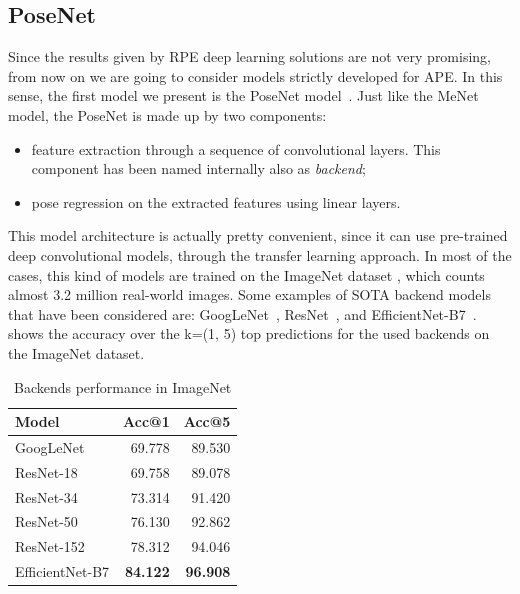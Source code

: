 \subsection{PoseNet}
Since the results given by RPE deep learning solutions are not very promising, from now on we are going to consider models strictly developed for APE.
In this sense, the first model we present is the PoseNet model~\cite{9348762}.
Just like the MeNet model, the PoseNet is made up by two components:
\begin{itemize}
    \item feature extraction through a sequence of convolutional layers. This component has been named internally also as \emph{backend};
    \item pose regression on the extracted features using linear layers.
\end{itemize}
This model architecture is actually pretty convenient, since it can use pre-trained deep convolutional models, through the transfer learning approach. In most of the cases, this kind of models are trained on the ImageNet dataset \cite{imagenet}, which counts almost 3.2 million real-world images. Some examples of SOTA backend models that have been considered are: GoogLeNet~\cite{googlenet}, ResNet~\cite{resnet}, and EfficientNet-B7~\cite{efficientnet}.  shows the accuracy over the k=(1, 5) top predictions for the used backends on the ImageNet dataset.

\begin{table}[htbp]
    \caption{Backends performance in ImageNet}
    \begin{center}
        \begin{tabular}{lrr}
            \toprule
            Model           & Acc@1           & Acc@5           \\
            \midrule
            GoogLeNet       & 69.778          & 89.530          \\
            ResNet-18       & 69.758          & 89.078          \\
            ResNet-34       & 73.314          & 91.420          \\
            ResNet-50       & 76.130          & 92.862          \\
            ResNet-152      & 78.312          & 94.046          \\
            EfficientNet-B7 & \textbf{84.122} & \textbf{96.908} \\
            \bottomrule
        \end{tabular}
        \label{tab:backend-performance-imagenet}
    \end{center}
\end{table}

